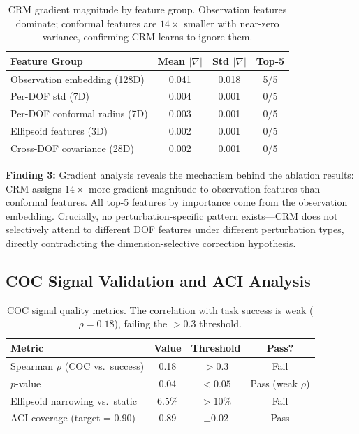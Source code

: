 \documentclass[letterpaper]{article}
\begin{document}
\begin{table}[h]
\centering
\caption{CRM gradient magnitude by feature group. Observation features dominate; conformal features are $14\times$ smaller with near-zero variance, confirming CRM learns to ignore them.}
\label{tab:grad}
\begin{tabular}{lccc}
\toprule
Feature Group & Mean $|\nabla|$ & Std $|\nabla|$ & Top-5 \\
\midrule
Observation embedding (128D) & 0.041 & 0.018 & 5/5 \\
Per-DOF std (7D) & 0.004 & 0.001 & 0/5 \\
Per-DOF conformal radius (7D) & 0.003 & 0.001 & 0/5 \\
Ellipsoid features (3D) & 0.002 & 0.001 & 0/5 \\
Cross-DOF covariance (28D) & 0.002 & 0.001 & 0/5 \\
\bottomrule
\end{tabular}
\end{table}

\textbf{Finding 3:} Gradient analysis reveals the mechanism behind the ablation results: CRM assigns $14\times$ more gradient magnitude to observation features than conformal features. All top-5 features by importance come from the observation embedding. Crucially, no perturbation-specific pattern exists---CRM does not selectively attend to different DOF features under different perturbation types, directly contradicting the dimension-selective correction hypothesis.

\subsection{COC Signal Validation and ACI Analysis}
\label{sec:exp-coc}

\begin{table}[h]
\centering
\caption{COC signal quality metrics. The correlation with task success is weak ($\rho{=}0.18$), failing the $>$0.3 threshold.}
\label{tab:coc}
\begin{tabular}{lccc}
\toprule
Metric & Value & Threshold & Pass? \\
\midrule
Spearman $\rho$ (COC vs.\ success) & 0.18 & $>0.3$ & Fail \\
$p$-value & 0.04 & $<0.05$ & Pass (weak $\rho$) \\
Ellipsoid narrowing vs.\ static & 6.5\% & $>10\%$ & Fail \\
ACI coverage (target = 0.90) & 0.89 & $\pm 0.02$ & Pass \\
\bottomrule
\end{tabular}
\end{table}
\end{document}
